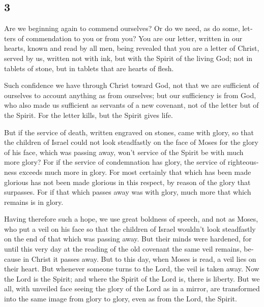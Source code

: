 \begin{paracol}{2}
\begin{otherlanguage}{english}
{\section{3}\label{section-5}}

 Are we beginning again to commend ourselves? Or do we
need, as do some, letters of commendation to you or from you?
 You are our letter, written in our hearts, known and read
by all men,  being revealed that you are a letter of
Christ, served by us, written not with ink, but with the Spirit of the
living God; not in tablets of stone, but in tablets that are hearts of
flesh.

 Such confidence we have through Christ toward God,
 not that we are sufficient of ourselves to account
anything as from ourselves; but our sufficiency is from God,
 who also made us sufficient as servants of a new
covenant, not of the letter but of the Spirit. For the letter kills, but
the Spirit gives life.

 But if the service of death, written engraved on stones,
came with glory, so that the children of Israel could not look
steadfastly on the face of Moses for the glory of his face, which was
passing away,  won't service of the Spirit be with much
more glory?  For if the service of condemnation has glory,
the service of righteousness exceeds much more in glory. 
For most certainly that which has been made glorious has not been made
glorious in this respect, by reason of the glory that surpasses.
 For if that which passes away was with glory, much more
that which remains is in glory.

 Having therefore such a hope, we use great boldness of
speech,  and not as Moses, who put a veil on his face so
that the children of Israel wouldn't look steadfastly on the end of that
which was passing away.  But their minds were hardened,
for until this very day at the reading of the old covenant the same veil
remains, because in Christ it passes away.  But to this
day, when Moses is read, a veil lies on their heart.  But
whenever someone turns to the Lord, the veil is taken away.
 Now the Lord is the Spirit; and where the Spirit of the
Lord is, there is liberty.  But we all, with unveiled
face seeing the glory of the Lord as in a mirror, are transformed into
the same image from glory to glory, even as from the Lord, the Spirit.


\end{otherlanguage}
\end{paracol}
